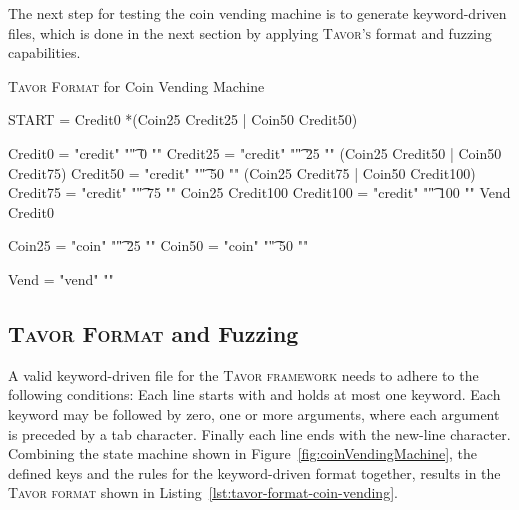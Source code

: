 The next step for testing the coin vending machine is to generate keyword-driven files, which is done in the next section by applying \textsc{Tavor's} format and fuzzing capabilities.

\begin{listing}
\caption{\textsc{Tavor Format} for Coin Vending Machine}
\label{lst:tavor-format-coin-vending}
\begin{gocode}
START = Credit0 *(Coin25 Credit25 | Coin50 Credit50)

Credit0  = "credit" "\t" 0 "\n"
Credit25 = "credit" "\t" 25 "\n" (Coin25 Credit50 | Coin50 Credit75)
Credit50 = "credit" "\t" 50 "\n" (Coin25 Credit75 | Coin50 Credit100)
Credit75 = "credit" "\t" 75 "\n" Coin25 Credit100
Credit100 = "credit" "\t" 100 "\n" Vend Credit0

Coin25 = "coin" "\t" 25 "\n"
Coin50 = "coin" "\t" 50 "\n"

Vend = "vend" "\n"
\end{gocode}
\end{listing}

\subsection{\textsc{Tavor Format} and Fuzzing}
\label{subsec:coinVendingMachineFormat}
 A valid keyword-driven file for the \textsc{Tavor framework}  needs to adhere to the following conditions: Each line starts with and holds at most one keyword. Each keyword may be followed by zero, one or more arguments, where each argument is preceded by a tab character. Finally each line ends with the new-line character. Combining the state machine shown in Figure~\ref{fig:coinVendingMachine}, the defined keys and the rules for the keyword-driven format together, results in the \textsc{Tavor format} shown in Listing~\ref{lst:tavor-format-coin-vending}.

